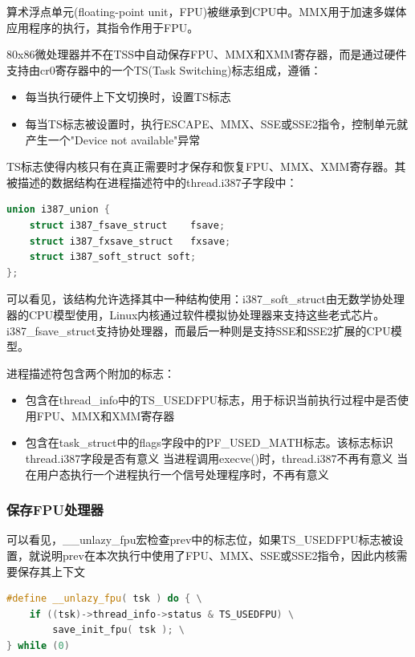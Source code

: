     算术浮点单元(floating-point unit，FPU)被继承到CPU中。MMX用于加速多媒体应用程序的执行，其指令作用于FPU。

    80x86微处理器并不在TSS中自动保存FPU、MMX和XMM寄存器，而是通过硬件支持由cr0寄存器中的一个TS(Task Switching)标志组成，遵循：

\begin{itemize}
    \item 每当执行硬件上下文切换时，设置TS标志
    \item 每当TS标志被设置时，执行ESCAPE、MMX、SSE或SSE2指令，控制单元就产生一个"Device not available"异常
\end{itemize}

    TS标志使得内核只有在真正需要时才保存和恢复FPU、MMX、XMM寄存器。其被描述的数据结构在进程描述符中的thread.i387子字段中：

\begin{lstlisting}[language=C++]
union i387_union {
    struct i387_fsave_struct	fsave;
    struct i387_fxsave_struct	fxsave;
    struct i387_soft_struct soft;
};
\end{lstlisting}

    可以看见，该结构允许选择其中一种结构使用：i387\_soft\_struct由无数学协处理器的CPU模型使用，Linux内核通过软件模拟协处理器来支持这些老式芯片。i387\_fsave\_struct支持协处理器，而最后一种则是支持SSE和SSE2扩展的CPU模型。

    进程描述符包含两个附加的标志：

\begin{itemize}
    \item 包含在thread\_info中的TS\_USEDFPU标志，用于标识当前执行过程中是否使用FPU、MMX和XMM寄存器
    \item 包含在task\_struct中的flags字段中的PF\_USED\_MATH标志。该标志标识thread.i387字段是否有意义
    \subitem 当进程调用execve()时，thread.i387不再有意义
    \subitem 当在用户态执行一个进程执行一个信号处理程序时，不再有意义
\end{itemize}

\subsubsection{保存FPU处理器}

    可以看见，\_\_unlazy\_fpu宏检查prev中的标志位，如果TS\_USEDFPU标志被设置，就说明prev在本次执行中使用了FPU、MMX、SSE或SSE2指令，因此内核需要保存其上下文

\begin{lstlisting}[language=C++]
#define __unlazy_fpu( tsk ) do { \
	if ((tsk)->thread_info->status & TS_USEDFPU) \
		save_init_fpu( tsk ); \
} while (0)
\end{lstlisting}


